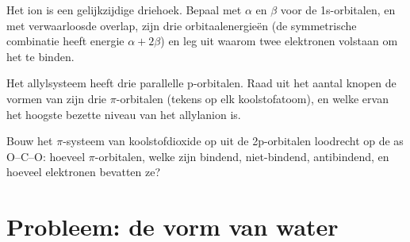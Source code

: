 \begin{exercise}[$\star\star\star$]\label{exo:b2:fragment-orbitals:10}
Het ion  is een gelijkzijdige driehoek. Bepaal met $\alpha$ en $\beta$ voor de 1s-orbitalen,
en met verwaarloosde overlap, zijn drie orbitaalenergieën (de symmetrische
combinatie heeft energie $\alpha + 2\beta$) en leg uit waarom twee elektronen volstaan om
het te binden.
\end{exercise}

\begin{exercise}[$\star\star\star$]\label{exo:b2:fragment-orbitals:11}
Het allylsysteem  heeft drie parallelle p-orbitalen. Raad uit het aantal knopen de vormen
van zijn drie $\pi$-orbitalen (tekens op elk koolstofatoom), en welke ervan
het hoogste bezette niveau van het allylanion is.
\end{exercise}

\begin{exercise}[$\star\star\star$]\label{exo:b2:fragment-orbitals:12}
Bouw het $\pi$-systeem van koolstofdioxide op uit de 2p-orbitalen loodrecht op de
as O--C--O: hoeveel $\pi$-orbitalen, welke zijn bindend, niet-bindend,
antibindend, en hoeveel elektronen bevatten ze?
\end{exercise}

\section{Probleem: de vorm van water}

